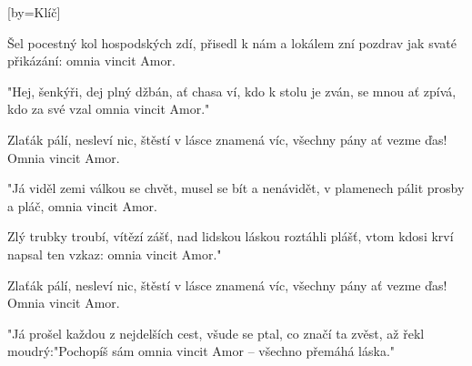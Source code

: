 [by={Klíč}]

\beginverse*{}
             
\endverse{}

\beginverse{}
Šel pocestný kol hospodských zdí,
přisedl k nám a lokálem zní
pozdrav jak svaté přikázání:
omnia vincit Amor.
\endverse{}

\beginverse{}
\chordsoff{}
"Hej, šenkýři, dej plný džbán,
ať chasa ví, kdo k stolu je zván,
se mnou ať zpívá, kdo za své vzal
omnia vincit Amor."
\chordson{}
\endverse{}

\beginchorus{}
Zlaťák pálí, nesleví nic,
štěstí v lásce znamená víc,
všechny pány ať vezme ďas! 
Omnia vincit Amor.
\endchorus{}

\beginverse{}
\chordsoff{}
"Já viděl zemi válkou se chvět,
musel se bít a nenávidět,
v plamenech pálit prosby a pláč,
omnia vincit Amor.
\chordson{}
\endverse{}

\beginverse{}
\chordsoff{}
Zlý trubky troubí, vítězí zášť,
nad lidskou láskou roztáhli plášť,
vtom kdosi krví napsal ten vzkaz:
omnia vincit Amor."
\chordson{}
\endverse{}

\repeatingchorus{}
\beginchorus{}
\chordsoff{}
Zlaťák pálí, nesleví nic,
štěstí v lásce znamená víc,
všechny pány ať vezme ďas! 
Omnia vincit Amor.
\chordson{}
\endchorus{}

\beginverse{}
\chordsoff{}
"Já prošel každou z nejdelších cest,
všude se ptal, co značí ta zvěst,
až řekl moudrý:"Pochopíš sám
omnia vincit Amor -- všechno přemáhá láska."
\chordson{}
\endverse{}

